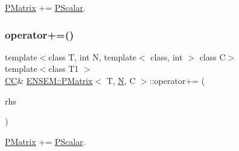 \mbox{\hyperlink{classENSEM_1_1PMatrix}{P\+Matrix}} += \mbox{\hyperlink{classENSEM_1_1PScalar}{P\+Scalar}}. 

\mbox{\label{classENSEM_1_1PMatrix_a141db586d4797230e05d41ab13c12a1e}} 
\subsubsection{\texorpdfstring{operator+=()}{operator+=()}\hspace{0.1cm}{\footnotesize\ttfamily [6/6]}}
{\footnotesize\ttfamily template$<$class T, int N, template$<$ class, int $>$ class C$>$ \\
template$<$class T1 $>$ \\
\mbox{\hyperlink{classENSEM_1_1PMatrix_a744bac549029029effe32dc1705660ec}{CC}}\& \mbox{\hyperlink{classENSEM_1_1PMatrix}{E\+N\+S\+E\+M\+::\+P\+Matrix}}$<$ T, \mbox{\hyperlink{adat__devel_2lib_2hadron_2operator__name__util_8cc_a7722c8ecbb62d99aee7ce68b1752f337}{N}}, C $>$\+::operator+= (\begin{DoxyParamCaption}\item[{const \mbox{\hyperlink{classENSEM_1_1PScalar}{P\+Scalar}}$<$ T1 $>$ \&}]{rhs }\end{DoxyParamCaption})\hspace{0.3cm}{\ttfamily [inline]}}



\mbox{\hyperlink{classENSEM_1_1PMatrix}{P\+Matrix}} += \mbox{\hyperlink{classENSEM_1_1PScalar}{P\+Scalar}}. 

\mbox{\label{classENSEM_1_1PMatrix_a76fa178c64fa75b73925016654a08766}} 
